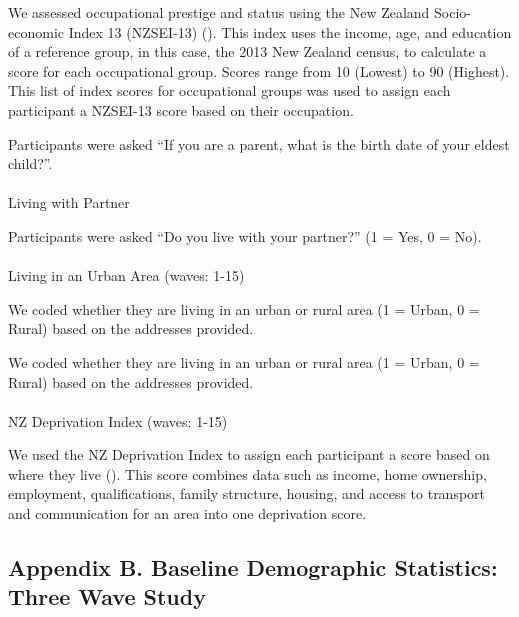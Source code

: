 \documentclass[
  single column]{article}
\makeatletter
\let\oldparagraph\paragraph
\renewcommand{\paragraph}{
    \@ifstar
      \xxxParagraphStar
      \xxxParagraphNoStar
  }
\newcommand{\xxxParagraphStar}[1]{\oldparagraph*{#1}\mbox{}}
\newcommand{\xxxParagraphNoStar}[1]{\oldparagraph{#1}\mbox{}}
\makeatother
\begin{document}
We assessed occupational prestige and status using the New Zealand
Socio-economic Index 13 (NZSEI-13) (). This index uses the income, age, and education of
a reference group, in this case, the 2013 New Zealand census, to
calculate a score for each occupational group. Scores range from 10
(Lowest) to 90 (Highest). This list of index scores for occupational
groups was used to assign each participant a NZSEI-13 score based on
their occupation.

Participants were asked ``If you are a parent, what is the birth date of
your eldest child?''.

\paragraph{Living with Partner}\label{living-with-partner}

Participants were asked ``Do you live with your partner?'' (1 = Yes, 0 =
No).

\paragraph{Living in an Urban Area (waves:
1-15)}\label{living-in-an-urban-area-waves-1-15}

We coded whether they are living in an urban or rural area (1 = Urban, 0
= Rural) based on the addresses provided.

We coded whether they are living in an urban or rural area (1 = Urban, 0
= Rural) based on the addresses provided.

\paragraph{NZ Deprivation Index (waves:
1-15)}\label{nz-deprivation-index-waves-1-15}

We used the NZ Deprivation Index to assign each participant a score
based on where they live (). This score combines data such as income, home ownership,
employment, qualifications, family structure, housing, and access to
transport and communication for an area into one deprivation score.

\subsection{Appendix B. Baseline Demographic Statistics: Three Wave
Study}\label{appendix-demographics}
\end{document}
